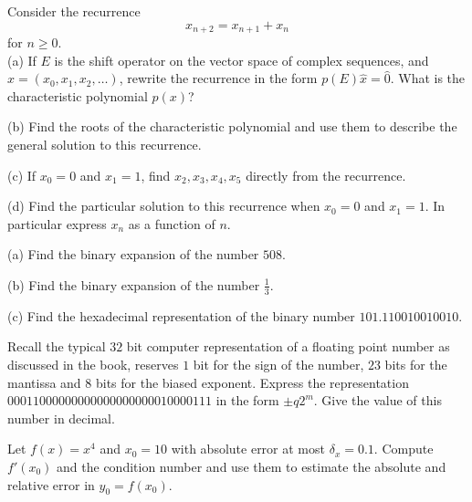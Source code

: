 \documentclass[12pt]{article}
\begin{document}
 
    
\newpage
{}
Consider the recurrence 
$$
x_{n+2}=x_{n+1}+x_n
$$
for $n \geq 0$. \\

\noindent
(a) If $E$ is the shift operator on the vector space of complex sequences, and $\hat{x}=(x_0,x_1,x_2,\dots)$, rewrite the recurrence in the form 
$p(E)\hat{x}=\hat{0}$. What is the characteristic polynomial $p(x)$? 

\vspace{2 in}

\noindent
(b) Find the roots of the characteristic polynomial and use them to describe the general solution to this recurrence. 

\vspace{1.5in}

\noindent
(c) If $x_0=0$ and $x_1=1$, find $x_2, x_3, x_4, x_5$ directly from the recurrence. \\

\vspace{1in}

\noindent
(d) Find the particular solution to this recurrence when $x_0=0$ and $x_1=1$. In particular express $x_n$ as a function of $n$.

\newpage

(a) Find the binary expansion of the number $508$. \\

\vspace{3 in}

\noindent
(b) Find the binary expansion of the number $\frac{1}{3}$. \\

\vspace{3 in}

\noindent
(c) Find the hexadecimal representation of the binary number $101.110010010010$.

\newpage

\noindent
Recall the typical $32$ bit computer representation of a floating point number as discussed in the book, reserves $1$ bit for the sign of the number, 
$23$ bits for the mantissa and $8$ bits for the biased exponent. Express the representation 
$00011000000000000000000010000111$ in the form $\pm q 2^m$. Give the value of this number in decimal.

\vspace{2.5 in}

\noindent
Let $f(x)=x^4$ and $x_0=10$ with absolute error at most $\delta_x=0.1$. Compute $f'(x_0)$ and the condition number and use them to estimate 
the absolute and relative error in $y_0=f(x_0)$. 
\end{document}
